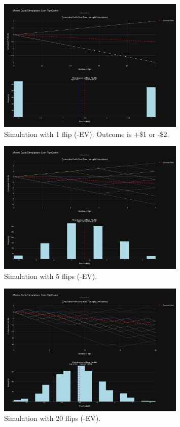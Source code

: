 \documentclass[12pt]{article}
\begin{document}
\begin{figure}[h!]
\centering
\includegraphics[width=0.8\textwidth]{-ev/1-ev.png}
\caption{Simulation with 1 flip (-EV). Outcome is +\$1 or -\$2.}
\end{figure}

\begin{figure}[h!]
\centering
\includegraphics[width=0.8\textwidth]{-ev/5-ev.png}
\caption{Simulation with 5 flips (-EV).}
\end{figure}
\clearpage

\begin{figure}[h!]
\centering
\includegraphics[width=0.8\textwidth]{-ev/20-ev.png}
\caption{Simulation with 20 flips (-EV).}
\end{figure}
\end{document}
